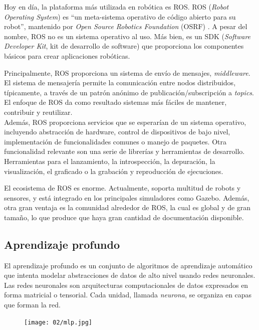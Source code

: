 \documentclass[../main.tex]{subfiles}
\begin{document}
Hoy en día, la plataforma más utilizada en robótica es ROS. ROS (\emph{Robot Operating System}) es ``un meta-sistema operativo de código abierto para su robot'', mantenido por \emph{Open Source Robotics Foundation} (OSRF) \cite{osrf}. A pesar del nombre, ROS no es un sistema operativo al uso. Más bien, es un SDK (\emph{Software Developer Kit}, kit de desarrollo de software) que proporciona los componentes básicos para crear aplicaciones robóticas.

Principalmente, ROS proporciona un sistema de envío de mensajes, \emph{middleware}. El sistema de mensajería permite la comunicación entre nodos distribuidos, típicamente, a través de un patrón anónimo de publicación/subscripción a \emph{topics}. El enfoque de ROS da como resultado sistemas más fáciles de mantener, contribuir y reutilizar. \\
Además, ROS proporciona servicios que se esperarían de un sistema operativo, incluyendo abstracción de hardware, control de dispositivos de bajo nivel, implementación de funcionalidades comunes o manejo de paquetes. Otra funcionalidad relevante son una serie de librerías y herramientas de desarrollo. Herramientas para el lanzamiento, la introspección, la depuración, la visualización, el graficado o la grabación y reproducción de ejecuciones.

El ecosistema de ROS es enorme. Actualmente, soporta multitud de robots y sensores, y está integrado en los principales simuladores como Gazebo. Además, otra gran ventaja es la comunidad alrededor de ROS, la cual es global y de gran tamaño, lo que produce que haya gran cantidad de documentación disponible.

\subsection{Aprendizaje profundo}
El aprendizaje profundo es un conjunto de algoritmos de aprendizaje automático que intenta modelar abstracciones de datos de alto nivel usando redes neuronales. Las redes neuronales son arquitecturas computacionales de datos expresados en forma matricial o tensorial. Cada unidad, llamada \emph{neurona}, se organiza en capas que forman la red.

\begin{figure}[ht]
 	{\texttt{[image: 02/mlp.jpg]}}
\end{figure}
\end{document}
